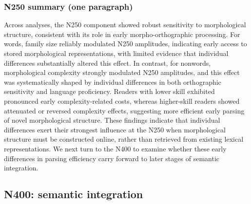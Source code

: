 \documentclass[preprint,12pt, authoryear, review]{elsarticle}
\begin{document}
	\subsubsection{N250 summary (one paragraph)}
	Across analyses, the N250 component showed robust sensitivity to morphological structure, consistent with its role in early morpho-orthographic processing. For words, family size reliably modulated N250 amplitudes, indicating early access to stored morphological representations, with limited evidence that individual differences substantially altered this effect. In contrast, for nonwords, morphological complexity strongly modulated N250 amplitudes, and this effect was systematically shaped by individual differences in both orthographic sensitivity and language proficiency. Readers with lower skill exhibited pronounced early complexity-related costs, whereas higher-skill readers showed attenuated or reversed complexity effects, suggesting more efficient early parsing of novel morphological structure. These findings indicate that individual differences exert their strongest influence at the N250 when morphological structure must be constructed online, rather than retrieved from existing lexical representations. We next turn to the N400 to examine whether these early differences in parsing efficiency carry forward to later stages of semantic integration.
	
	\subsection{N400: semantic integration}	
	
\end{document}
